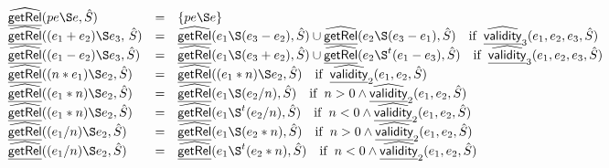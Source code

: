 \[\begin{array}{ll}
& \begin{array}{lll}
  \ahf{getRel}(pe \rel e, \hat{S}) &=& \{pe \rel e\}\\
  \ahf{getRel}((e_1 + e_2) \rel e_3, \, \hat{S})  &=& \ahf{getRel} (e_1 \rel (e_3 - e_2), \hat{S}) \cup \ahf{getRel} (e_2 \rel (e_3 - e_1), \hat{S}) \quad \ifc{\ahf{validity}_3(e_1, e_2, e_3, \hat{S})}\\
  \ahf{getRel}((e_1 - e_2) \rel e_3, \hat{S})  &=& \ahf{getRel} (e_1 \rel (e_3 + e_2), \hat{S}) \cup \ahf{getRel} (e_2 \rel^t (e_1 - e_3), \hat{S})\quad \ifc{\ahf{validity}_3(e_1, e_2, e_3, \hat{S})}\\
  \ahf{getRel} ((n * e_1) \rel e_2, \hat{S})  &=& \ahf{getRel} ((e_1  * n) \rel e_2, \hat{S}) \quad \ifc{\ahf{validity}_2(e_1, e_2, \hat{S})}\\
  \ahf{getRel} ((e_1  * n) \rel e_2, \hat{S}) &=& \ahf{getRel} (e_1 \rel (e_2/n), \hat{S}) \quad \ifc {n>0 \land \ahf{validity}_2(e_1, e_2, \hat{S})}\\
  \ahf{getRel} ((e_1  * n) \rel e_2, \hat{S}) &=& \ahf{getRel} (e_1 \rel^t (e_2/n), \hat{S}) \quad \ifc {n<0 \land \ahf{validity}_2(e_1, e_2, \hat{S})}\\
  \ahf{getRel} ((e_1  / n) \rel e_2, \hat{S}) &=& \ahf{getRel} (e_1 \rel (e_2*n), \hat{S}) \quad \ifc {n>0 \land \ahf{validity}_2(e_1, e_2, \hat{S})}\\
  \ahf{getRel} ((e_1  / n) \rel e_2, \hat{S}) &=& \ahf{getRel} (e_1 \rel^t (e_2*n), \hat{S}) \quad \ifc {n<0 \land \ahf{validity}_2(e_1, e_2, \hat{S})}\\
\end{array}\\


\end{array}\]
